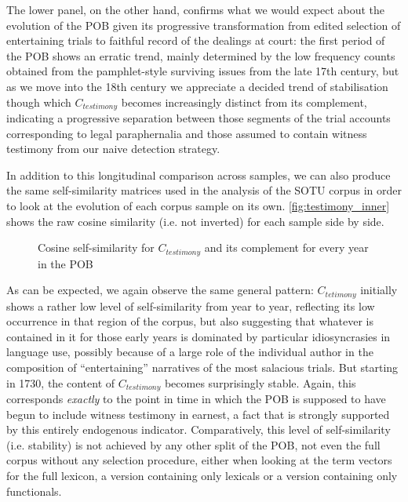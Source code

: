 The lower panel, on the other hand, confirms what we would expect about the evolution of the POB given its progressive transformation from edited selection of entertaining trials to faithful record of the dealings at court: the first period of the POB shows an erratic trend, mainly determined by the low frequency counts obtained from the pamphlet-style surviving issues from the late 17th century, but as we move into the 18th century we appreciate a decided trend of stabilisation though which $C_{testimony}$ becomes increasingly distinct from its complement, indicating a progressive separation between those segments of the trial accounts corresponding to legal paraphernalia and those assumed to contain witness testimony from our naive detection strategy.

In addition to this longitudinal comparison across samples, we can also produce the same self-similarity matrices used in the analysis of the SOTU corpus in order to look at the evolution of each corpus sample on its own.
\autoref{fig:testimony_inner} shows the raw cosine similarity (i.e. not inverted) for each sample side by side.

\begin{figure}
    \centerfloat
    
    \caption[Cosine similarities for $C_{testimony}$ and complement]{
        Cosine self-similarity for $C_{testimony}$ and its complement for every year in the POB
    }
    \label{fig:testimony_inner}
\end{figure}

As can be expected, we again observe the same general pattern: $C_{tetimony}$ initially shows a rather low level of self-similarity from year to year, reflecting its low occurrence in that region of the corpus, but also suggesting that whatever is contained in it for those early years is dominated by particular idiosyncrasies in language use, possibly because of a large role of the individual author in the composition of ``entertaining'' narratives of the most salacious trials.
But starting in 1730, the content of $C_{testimony}$ becomes surprisingly stable.
Again, this corresponds \emph{exactly} to the point in time in which the POB is supposed to have begun to include witness testimony in earnest, a fact that is strongly supported by this entirely endogenous indicator.
Comparatively, this level of self-similarity (i.e. stability) is not achieved by any other split of the POB, not even the full corpus without any selection procedure, either when looking at the term vectors for the full lexicon, a version containing only lexicals or a version containing only functionals.

